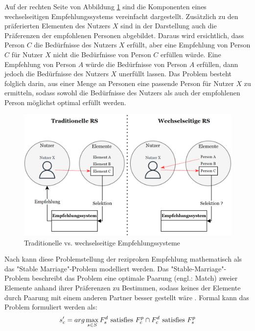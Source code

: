 Auf der rechten Seite von Abbildung \ref{fig:empfehlungssysteme:rrs:abb1} sind die Komponenten eines wechselseitigen Empfehlungssystems vereinfacht dargestellt.
Zusätzlich zu den präferierten Elementen des Nutzers $X$ sind in der Darstellung auch die Präferenzen der empfohlenen Personen abgebildet.
Daraus wird ersichtlich, dass Person $C$ die Bedürfnisse des Nutzers $X$ erfüllt, aber eine Empfehlung von Person $C$ für Nutzer $X$ nicht die Bedürfnisse von Person $C$ erfüllen würde.
Eine Empfehlung von Person $A$ würde die Bedürfnisse von Person $A$ erfüllen, dann jedoch die Bedürfnisse des Nutzers $X$ unerfüllt lassen.
Das Problem besteht folglich darin, aus einer Menge an Personen eine passende Person für Nutzer $X$ zu ermitteln, sodass sowohl die Bedürfnisse des Nutzers als auch der empfohlenen Person möglichst optimal erfüllt werden.

\begin{figure}[H]
    \centering
	\includegraphics[width=1.0\textwidth]{gfx/traditional-vs-rrs.png}
	\caption[Traditionelle vs. wechselseitige Empfehlungssysteme]{Traditionelle vs. wechselseitige Empfehlungssysteme\\}
	\label{fig:empfehlungssysteme:rrs:abb1}
\end{figure}

Nach \textcite[S. 36]{li:inproceedings} kann diese Problemstellung der reziproken Empfehlung mathematisch als das "Stable Marriage"-Problem modelliert werden.
Das "Stable-Marriage"-Problem beschreibt das Problem eine optimale Paarung (engl.: Match) zweier Elemente anhand ihrer Präferenzen zu Bestimmen, sodass keines der Elemente durch Paarung mit einem anderen Partner besser gestellt wäre \cite[S. 36]{li:inproceedings}\cite[S. 67]{diaz:inproceedings}.
Formal kann das Problem formuliert werden als:
\begin{equation}\label{eq10}
    s'_c = arg\max_{s \in S} F_{s}^{d} \textnormal{ satisfies } F_{c}^{p} \cap F_{c}^{d} \textnormal{ satisfies } F_{s}^{p}
\end{equation}

